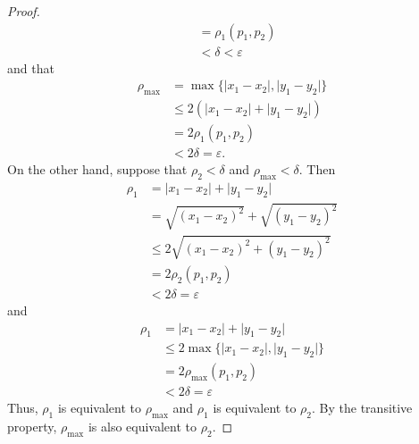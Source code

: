 \documentclass{article}
\begin{document}
\begin{enumerate}
\begin{proof}
\begin{align*}
                                         & = \rho_1(p_1, p_2)                                                                                      \\
                                         & < \delta < \varepsilon
                  \end{align*}
                  and that
                  \begin{align*}
                        \rho_{\max} & = \max\{\lvert x_1-x_2\rvert,\lvert y_1-y_2\rvert\} \\
                                    & \leq 2(\lvert x_1-x_2\rvert+\lvert y_1-y_2\rvert)   \\
                                    & = 2\rho_1(p_1, p_2)                                 \\
                                    & < 2\delta = \varepsilon.
                  \end{align*}
                  On the other hand, suppose that $\rho_2<\delta$ and $\rho_{\max}<\delta$.
                  Then
                  \begin{align*}
                        \rho_1 & = \lvert x_1-x_2\rvert + \lvert y_1-y_2\rvert \\
                               & = \sqrt{(x_1-x_2)^2} + \sqrt{(y_1-y_2)^2}     \\
                               & \leq 2\sqrt{(x_1-x_2)^2+(y_1-y_2)^2}          \\
                               & = 2\rho_2(p_1, p_2)                           \\
                               & < 2\delta = \varepsilon
                  \end{align*}
                  and
                  \begin{align*}
                        \rho_1 & = \lvert x_1-x_2\rvert + \lvert y_1-y_2\rvert           \\
                               & \leq 2\max\{\lvert x_1-x_2\rvert,\lvert y_1-y_2\rvert\} \\
                               & = 2\rho_{\max}(p_1, p_2)                                \\
                               & < 2\delta = \varepsilon
                  \end{align*}
                  Thus, $\rho_1$ is equivalent to $\rho_{\max}$ and $\rho_1$ is equivalent
                  to $\rho_2$. By the transitive property, $\rho_{\max}$ is also equivalent
                  to $\rho_2$.
            \end{proof}

\end{enumerate}
\end{document}
